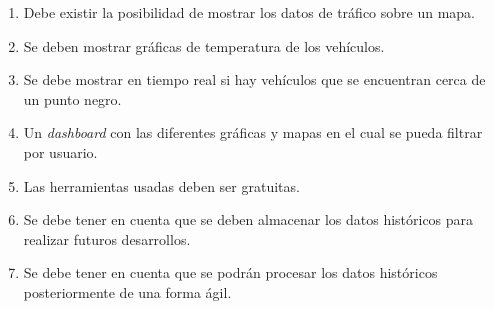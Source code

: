 \begin{enumerate}
\item Debe existir la posibilidad de mostrar los datos de tráfico sobre un
  mapa.
\item Se deben mostrar gráficas de temperatura de los vehículos.
\item Se debe mostrar en tiempo real si hay vehículos que se encuentran
  cerca de un punto negro.
\item Un {\em dashboard} con las diferentes gráficas y mapas en el cual se
  pueda filtrar por usuario.
\item Las herramientas usadas deben ser gratuitas.
\item Se debe tener en cuenta que se deben almacenar los datos históricos
  para realizar futuros desarrollos.
\item Se debe tener en cuenta que se podrán procesar los datos históricos
  posteriormente de una forma ágil.
\end{enumerate}

